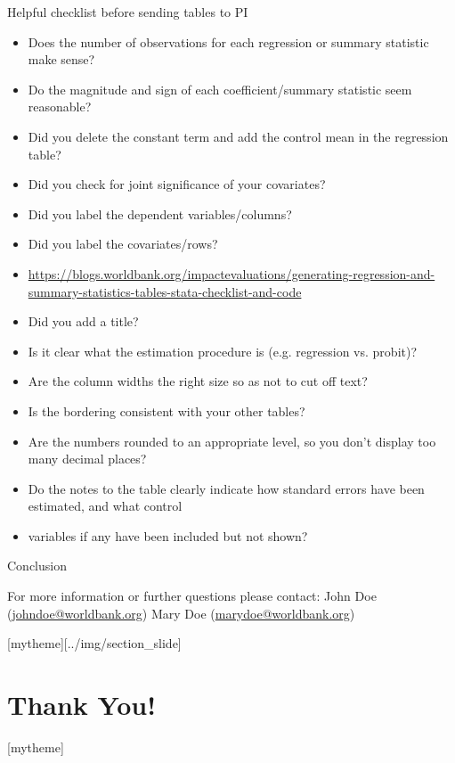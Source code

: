 \documentclass[aspectratio=169]{beamer}
\newcommand{\sectionpic}[2]{
	\setbeamertemplate{section page}[mytheme][#2]
	\section{#1}
	\setbeamertemplate{section page}[mytheme]
}
\begin{document}
\begin{frame}[fragile]{Helpful checklist before sending tables to PI}
\begin{multicols}{2}	
	\begin{itemize}
		\item Does the number of observations for each regression or summary statistic make sense?
		\item Do the magnitude and sign of each coefficient/summary statistic seem reasonable?
		\item Did you delete the constant term and add the control mean in the regression table?
		\item Did you check for joint significance of your covariates?
		\item Did you label the dependent variables/columns?
		\item Did you label the covariates/rows?
		\item \url{https://blogs.worldbank.org/impactevaluations/generating-regression-and-summary-statistics-tables-stata-checklist-and-code}
	\end{itemize}

	\begin{itemize}
		\item Did you add a title?
		\item Is it clear what the estimation procedure is (e.g. regression vs. probit)?
		\item Are the column widths the right size so as not to cut off text?
		\item Is the bordering consistent with your other tables?
		\item Are the numbers rounded to an appropriate level, so you don’t display too many decimal places?
		\item Do the notes to the table clearly indicate how standard errors have been estimated, and what control \item variables if any have been included but not shown?
	\end{itemize}
\end{multicols}
\end{frame}

\begin{frame}{Conclusion}


\vspace{20mm}
For more information or further questions please contact:
\newline John Doe (\url{johndoe@worldbank.org}) \newline Mary Doe (\url{marydoe@worldbank.org})

\end{frame}

\sectionpic{Thank You!}{../img/section_slide}
\end{document}
